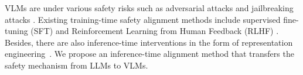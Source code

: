 
VLMs are under various safety risks such as adversarial attacks \cite{qi2023visual, carlini2024aligned, zhao2024evaluating} and jailbreaking attacks \cite{niu2024jailbreaking, gong2023figstep, li2024images}.
Existing training-time safety alignment methods include supervised fine-tuning (SFT) \cite{llava_VLGuard, chen2023dress} and Reinforcement Learning from Human Feedback (RLHF) \cite{bai2022training, ouyang2022training}.
Besides, there are also inference-time interventions in the form of representation engineering~\cite{li2024inference,zou2023representation,zheng2024prompt,wang2024inferaligner}.
We propose an inference-time alignment method that transfers the safety mechanism from LLMs to VLMs.